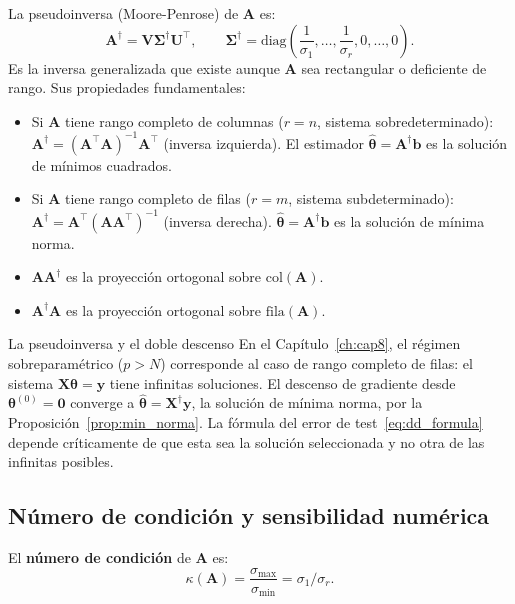 La pseudoinversa (Moore-Penrose) de $\bm{A}$ es:
\begin{equation}
  \bm{A}^\dagger = \bm{V}\bm{\Sigma}^\dagger\bm{U}^\top,
  \qquad
  \bm{\Sigma}^\dagger = \mathrm{diag}\!\left(\frac{1}{\sigma_1},\ldots,
  \frac{1}{\sigma_r},0,\ldots,0\right).
  \label{eq:ap_pseudoinversa}
\end{equation}
Es la inversa generalizada que existe aunque $\bm{A}$ sea rectangular o
deficiente de rango. Sus propiedades fundamentales:
\begin{itemize}
  \item Si $\bm{A}$ tiene rango completo de columnas ($r = n$, sistema
        sobredeterminado): $\bm{A}^\dagger = (\bm{A}^\top\bm{A})^{-1}\bm{A}^\top$
        (inversa izquierda). El estimador $\hat{\bm{\theta}} = \bm{A}^\dagger\bm{b}$
        es la solución de mínimos cuadrados.
  \item Si $\bm{A}$ tiene rango completo de filas ($r = m$, sistema subdeterminado):
        $\bm{A}^\dagger = \bm{A}^\top(\bm{A}\bm{A}^\top)^{-1}$ (inversa derecha).
        $\hat{\bm{\theta}} = \bm{A}^\dagger\bm{b}$ es la solución de mínima norma.
  \item $\bm{A}\bm{A}^\dagger$ es la proyección ortogonal sobre $\mathrm{col}(\bm{A})$.
  \item $\bm{A}^\dagger\bm{A}$ es la proyección ortogonal sobre $\mathrm{fila}(\bm{A})$.
\end{itemize}

\begin{observacion}{La pseudoinversa y el doble descenso}
En el Capítulo~\ref{ch:cap8}, el régimen sobreparamétrico ($p > N$) corresponde
al caso de rango completo de filas: el sistema $\bm{X}\bm{\theta} = \bm{y}$
tiene infinitas soluciones. El descenso de gradiente desde $\bm{\theta}^{(0)} =
\bm{0}$ converge a $\hat{\bm{\theta}} = \bm{X}^\dagger\bm{y}$, la solución de
mínima norma, por la Proposición~\ref{prop:min_norma}. La fórmula del error de
test~\eqref{eq:dd_formula} depende críticamente de que esta sea la solución
seleccionada y no otra de las infinitas posibles.
\end{observacion}

\subsection{Número de condición y sensibilidad numérica}
\label{subsec:ap_condicion}

El \textbf{número de condición} de $\bm{A}$ es:
\begin{equation}
  \kappa(\bm{A}) = \frac{\sigma_{\max}}{\sigma_{\min}} = \sigma_1/\sigma_r.
  \label{eq:ap_condicion}
\end{equation}

